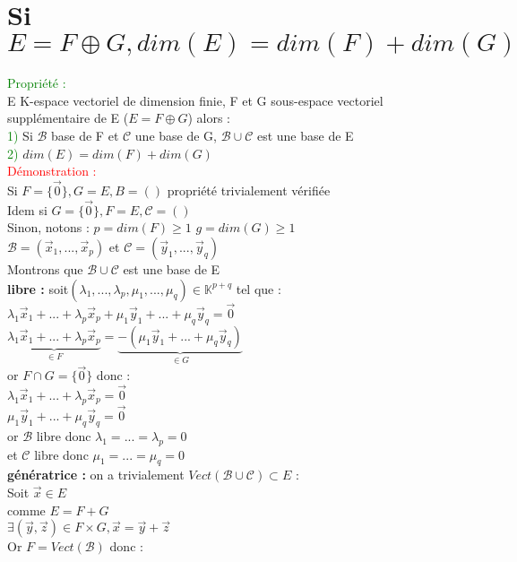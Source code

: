 \documentclass{article}
\begin{document}
\section{Si $E= F \oplus G, dim(E)=dim(F)+dim(G)$}
\textcolor{green}{Propriété :} \\
E K-espace vectoriel de dimension finie, F et G sous-espace vectoriel supplémentaire de E ($E=F \oplus G$) alors : \\
\textcolor{green}{1)} Si $\mathcal B$ base de F et $\mathcal C$ une base de G, $\mathcal B \cup \mathcal C$ est une base de E \\
\textcolor{green}{2)} $dim(E)=dim(F)+dim(G)$ \\
\textcolor{red}{Démonstration :} \\
Si $F=\lbrace \vec 0 \rbrace ,G=E,B=()$ propriété trivialement vérifiée \\
Idem si $G=\lbrace \vec 0 \rbrace,F=E,\mathcal C=() $ \\
Sinon, notons : $p=dim(F) \geq 1$ $g=dim(G) \geq 1$ \\
$\mathcal B = (\vec x_1, ... ,\vec x_p)$ et $\mathcal C = (\vec y_1, ..., \vec y_q)$ \\
Montrons que $\mathcal B \cup \mathcal C$ est une base de E  \\
{\bf libre :} soit$(\lambda_1,...,\lambda_p,\mu_1,...,\mu_q) \in \mathbb K^{p+q}$ tel que : \\
$\lambda_1 \vec x_1 + ... + \lambda_p \vec x_p + \mu_1 \vec y_1 +... + \mu_q \vec y_q = \vec 0$ \\
$\underbrace{\lambda_1 \vec x_1 + ... + \lambda_p \vec x_p}_{\in F} = \underbrace{ -(\mu_1 \vec y_1 +... + \mu_q \vec y_q)}_{\in G}$ \\
or $F \cap  G =\lbrace \vec 0 \rbrace$ donc : \\
$\lambda_1 \vec x_1 + ... + \lambda_p \vec x_p=\vec 0$ \\
$\mu_1 \vec y_1 +... + \mu_q \vec y_q=\vec 0$ \\
or $\mathcal B$ libre donc $ \lambda_1=...=\lambda_p=0$ \\
et $\mathcal C$ libre donc $\mu_1=...=\mu_q=0$ \\
{\bf génératrice :} on a trivialement $Vect(\mathcal B \cup \mathcal C) \subset E$ : \\
Soit $\vec x \in E$ \\
comme $E=F +G $ \\
$\exists (\vec y, \vec z) \in F \times G, \vec x =\vec y + \vec z$ \\
Or $F= Vect(\mathcal B)$ donc : \\
\end{document}
